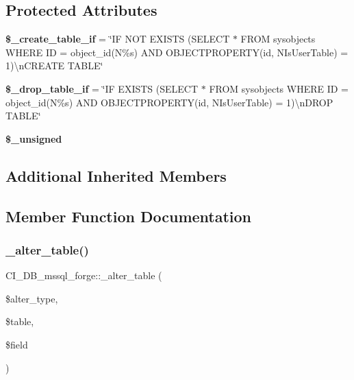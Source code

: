 \subsection*{Protected Attributes}
\begin{DoxyCompactItemize}
\item 
\mbox{\label{class_c_i___d_b__mssql__forge_a3883034d5abc5633214ea36d7a5c70dd}} 
{\bfseries \$\+\_\+create\+\_\+table\+\_\+if} = \char`\"{}IF N\+OT E\+X\+I\+S\+TS (S\+E\+L\+E\+CT $\ast$ F\+R\+OM sysobjects W\+H\+E\+RE ID = object\+\_\+id(N\textquotesingle{}\%s\textquotesingle{}) A\+ND O\+B\+J\+E\+C\+T\+P\+R\+O\+P\+E\+R\+TY(id, N\textquotesingle{}Is\+User\+Table\textquotesingle{}) = 1)\textbackslash{}n\+C\+R\+E\+A\+TE T\+A\+B\+LE\char`\"{}
\item 
\mbox{\label{class_c_i___d_b__mssql__forge_a45c84b134612280a8dc7865106a2a7f0}} 
{\bfseries \$\+\_\+drop\+\_\+table\+\_\+if} = \char`\"{}IF E\+X\+I\+S\+TS (S\+E\+L\+E\+CT $\ast$ F\+R\+OM sysobjects W\+H\+E\+RE ID = object\+\_\+id(N\textquotesingle{}\%s\textquotesingle{}) A\+ND O\+B\+J\+E\+C\+T\+P\+R\+O\+P\+E\+R\+TY(id, N\textquotesingle{}Is\+User\+Table\textquotesingle{}) = 1)\textbackslash{}n\+D\+R\+OP T\+A\+B\+LE\char`\"{}
\item 
{\bfseries \$\+\_\+unsigned}
\end{DoxyCompactItemize}
\subsection*{Additional Inherited Members}


\subsection{Member Function Documentation}
\mbox{\label{class_c_i___d_b__mssql__forge_afbd25285c72f0eb96c01fe66e441105a}} 
\subsubsection{\texorpdfstring{\+\_\+alter\+\_\+table()}{\_alter\_table()}}
{\footnotesize\ttfamily C\+I\+\_\+\+D\+B\+\_\+mssql\+\_\+forge\+::\+\_\+alter\+\_\+table (\begin{DoxyParamCaption}\item[{}]{\$alter\+\_\+type,  }\item[{}]{\$table,  }\item[{}]{\$field }\end{DoxyParamCaption})\hspace{0.3cm}{\ttfamily [protected]}}

